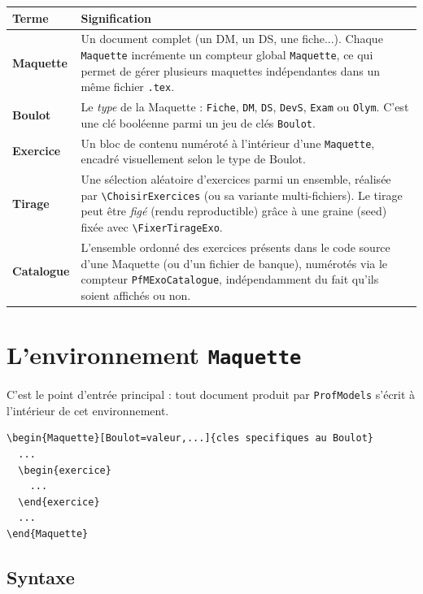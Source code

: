 \documentclass[11pt,a4paper]{article}
\newcommand{\pkg}[1]{\texttt{#1}}
\newcommand{\cmdname}[1]{\texttt{\textbackslash#1}}
\begin{document}
\begin{longtable}{@{}p{3cm}p{11.5cm}@{}}
\toprule
\textbf{Terme} & \textbf{Signification} \\
\midrule
\endhead
\textbf{Maquette} & Un document complet (un DM, un DS, une fiche...). Chaque \texttt{Maquette} incrémente un compteur global \texttt{Maquette}, ce qui permet de gérer plusieurs maquettes indépendantes dans un même fichier \texttt{.tex}. \\[4pt]
\textbf{Boulot} & Le \textit{type} de la Maquette : \texttt{Fiche}, \texttt{DM}, \texttt{DS}, \texttt{DevS}, \texttt{Exam} ou \texttt{Olym}. C'est une clé booléenne parmi un jeu de clés \texttt{Boulot}. \\[4pt]
\textbf{Exercice} & Un bloc de contenu numéroté à l'intérieur d'une \texttt{Maquette}, encadré visuellement selon le type de Boulot. \\[4pt]
\textbf{Tirage} & Une sélection aléatoire d'exercices parmi un ensemble, réalisée par \cmdname{ChoisirExercices} (ou sa variante multi-fichiers). Le tirage peut être \textit{figé} (rendu reproductible) grâce à une graine (seed) fixée avec \cmdname{FixerTirageExo}. \\[4pt]
\textbf{Catalogue} & L'ensemble ordonné des exercices présents dans le code source d'une Maquette (ou d'un fichier de banque), numérotés via le compteur \texttt{PfMExoCatalogue}, indépendamment du fait qu'ils soient affichés ou non. \\
\bottomrule
\end{longtable}

\section{L'environnement \texttt{Maquette}}

C'est le point d'entrée principal : tout document produit par \pkg{ProfModels} s'écrit à l'intérieur de cet environnement.

\begin{lstlisting}
\begin{Maquette}[Boulot=valeur,...]{cles specifiques au Boulot}
  ...
  \begin{exercice}
    ...
  \end{exercice}
  ...
\end{Maquette}
\end{lstlisting}

\subsection{Syntaxe}
\end{document}
